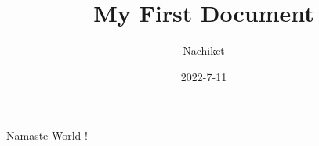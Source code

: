 \documentclass{article}
\title{My First Document}
\date{2022-7-11}
\author{Nachiket}
\begin{document}
\maketitle
\newpage
Namaste World !
\end{document}
